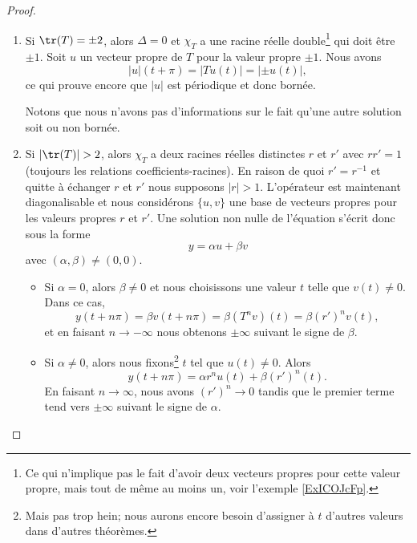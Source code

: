 \begin{proof}
\begin{enumerate}
        \item

            Si \( \tr(T)=\pm 2\), alors \( \Delta=0\) et \( \chi_T\) a une racine réelle double\footnote{Ce qui n'implique pas le fait d'avoir deux vecteurs propres pour cette valeur propre, mais tout de même au moins un, voir l'exemple \ref{ExICOJcFp}.} qui doit être \( \pm 1\). Soit \( u\) un vecteur propre de \( T\) pour la valeur propre \( \pm 1\). Nous avons
            \begin{equation}
                | u |(t+\pi)=| Tu(t) |=| \pm u(t) |,
            \end{equation}
            ce qui prouve encore que \( | u |\) est périodique et donc bornée.

            Notons que nous n'avons pas d'informations sur le fait qu'une autre solution soit ou non bornée.

        \item

            Si \( | \tr(T) |>2\), alors \( \chi_T\) a deux racines réelles distinctes \( r\) et \( r'\) avec \( rr'=1\) (toujours les relations coefficients-racines). En raison de quoi \( r'=r^{-1}\) et quitte à échanger \( r\) et \( r'\) nous supposons \( | r |>1\). L'opérateur est maintenant diagonalisable et nous considérons \( \{ u,v \}\) une base de vecteurs propres pour les valeurs propres \( r\) et \( r'\). Une solution non nulle de l'équation s'écrit donc sous la forme
            \begin{equation}
                y=\alpha u+\beta v
            \end{equation}
            avec \( (\alpha,\beta)\neq (0,0)\).

            \begin{itemize}
                \item Si \( \alpha=0\), alors \( \beta\neq 0\) et nous choisissons une valeur \( t\) telle que \( v(t)\neq 0\). Dans ce cas,
                    \begin{equation}
                        y(t+n\pi)=\beta v(t+n\pi)=\beta(T^nv)(t)=\beta (r')^n v(t),
                    \end{equation}
                    et en faisant \( n\to -\infty\) nous obtenons \( \pm \infty\) suivant le signe de \( \beta\).

                \item Si \( \alpha\neq 0\), alors nous fixons\footnote{Mais pas trop hein; nous aurons encore besoin d'assigner à \( t\) d'autres valeurs dans d'autres théorèmes.} \( t\) tel que \( u(t)\neq 0\). Alors
                    \begin{equation}
                        y(t+n\pi)=\alpha r^nu(t)+\beta (r')^n(t).
                    \end{equation}
                    En faisant \( n\to \infty\), nous avons \( (r')^n\to 0\) tandis que le premier terme tend vers \( \pm\infty\) suivant le signe de \( \alpha\).
            \end{itemize}


\end{enumerate}
\end{proof}
